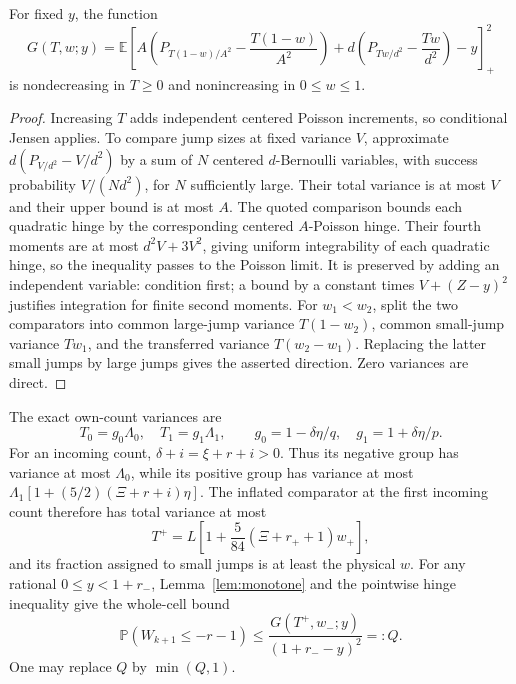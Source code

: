 \documentclass[11pt,a4paper]{article}
\newcommand{\E}{\mathbb E}\newcommand{\Pp}{\mathbb P}
\begin{document}
\begin{lemma}\label{lem:monotone}
For fixed $y$, the function
\[
 G(T,w;y)=\E\left[
 A\left(P_{T(1-w)/A^2}-\frac{T(1-w)}{A^2}\right)
 +d\left(P_{Tw/d^2}-\frac{Tw}{d^2}\right)-y\right]_+^2
\]
is nondecreasing in $T\ge0$ and nonincreasing in $0\le w\le1$.
\end{lemma}
\begin{proof}
Increasing $T$ adds independent centered Poisson increments, so conditional
Jensen applies. To compare jump sizes at fixed variance $V$, approximate
$d(P_{V/d^2}-V/d^2)$ by a sum of $N$ centered $d$-Bernoulli variables,
with success probability $V/(Nd^2)$, for $N$ sufficiently large.
Their total variance is at most $V$ and their upper bound is at most $A$.
The quoted comparison bounds each quadratic hinge by the corresponding
centered $A$-Poisson hinge. Their fourth moments are at most
$d^2V+3V^2$, giving uniform integrability of each quadratic hinge, so the
inequality passes to the Poisson limit. It is preserved by adding an
independent variable: condition first; a bound by a constant times
$V+(Z-y)^2$ justifies integration for finite second moments.
For $w_1<w_2$, split the two comparators into common large-jump variance
$T(1-w_2)$, common small-jump variance $Tw_1$, and the transferred variance
$T(w_2-w_1)$. Replacing the latter small jumps by large jumps gives the
asserted direction. Zero variances are direct.
\end{proof}

The exact own-count variances are
\begin{equation}\label{eq:transport}
 T_0=g_0\Lambda_0,\quad T_1=g_1\Lambda_1,\qquad
 g_0=1-\delta\eta/q,\quad g_1=1+\delta\eta/p.
\end{equation}
For an incoming count, $\delta+i=\xi+r+i>0$. Thus its negative group
has variance at most $\Lambda_0$, while its positive group has variance
at most $\Lambda_1[1+(5/2)(\Xi+r+i)\eta]$.
The inflated comparator at the first incoming count therefore has total
variance at most
\begin{equation}\label{eq:firstT}
 T^+=L\left[1+\frac{5}{84}(\Xi+r_++1)w_+\right],
\end{equation}
and its fraction assigned to small jumps is at least the physical $w$.
For any rational $0\le y<1+r_-$, Lemma~\ref{lem:monotone} and the
pointwise hinge inequality give the whole-cell bound
\begin{equation}\label{eq:first}
 \Pp(W_{k+1}\le-r-1)\le
 \frac{G(T^+,w_-;y)}{(1+r_--y)^2}=:Q.
\end{equation}
One may replace $Q$ by $\min(Q,1)$.
\end{document}
